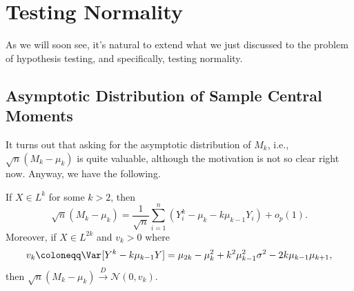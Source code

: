 \section{Testing Normality}
As we will soon see, it's natural to extend what we just discussed to the problem of hypothesis testing, and specifically, testing normality.

\subsection{Asymptotic Distribution of Sample Central Moments}
It turns out that asking for the asymptotic distribution of \(M_k\), i.e., \(\sqrt{n} (M_k - \mu _k)\) is quite valuable, although the motivation is not so clear right now. Anyway, we have the following.

\begin{theorem}\label{thm:asymptotic-distribution-sample-central-moment}
	If \(X \in L^{k}\) for some \(k > 2\), then
	\[
		\sqrt{n} (M_k - \mu _k)
		= \frac{1}{\sqrt{n} } \sum_{i=1}^{n} (Y_i^k - \mu _k - k \mu _{k-1} Y_i) + o_p(1).
	\]
	Moreover, if \(X \in L^{2k}\) and \(v_k > 0\) where
	\[
		v_k
		\coloneqq \Var_{}[Y^k - k \mu _{k-1}Y]
		= \mu _{2k} - \mu _k^2 + k^2 \mu _{k-1}^2 \sigma ^2 - 2 k \mu _{k-1} \mu _{k+1} ,
	\]
	then \(\sqrt{n} (M_k - \mu _k) \overset{D}{\to} \mathcal{N} (0, v_k)\).
\end{theorem}
